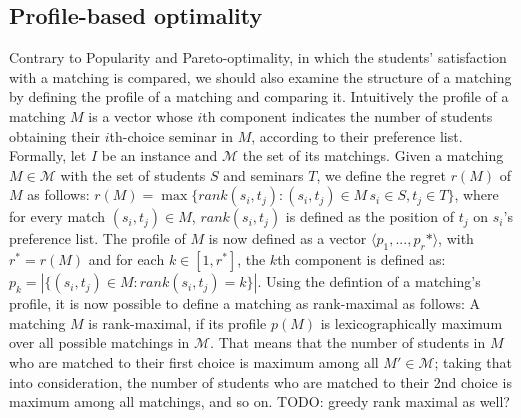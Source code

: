 \subsection{Profile-based optimality}
Contrary to Popularity and Pareto-optimality, in which the students' satisfaction with a matching is compared, we should also examine the structure of a matching by defining the profile of a matching and comparing it. Intuitively the profile of a matching $M$ is a vector whose $i$th component indicates the number of students obtaining their $i$th-choice seminar in $M$, according to their preference list. 
\newline
Formally, let $I$ be an instance and $\mathcal{M}$ the set of its matchings. Given a matching $M \in \mathcal{M}$ with the set of students $S$ and seminars $T$, we define the regret $r(M)$ of $M$ as follows:
$r(M) = \max \{rank(s_i, t_j): (s_i, t_j)\in M\, s_i \in S, t_j \in T\}$, where for every match $(s_i, t_j) \in M$, $rank(s_i, t_j)$ is defined as the position of $t_j$ on $s_i$'s preference list. The profile of $M$ is now defined as a vector $\langle p_1,..., p_r* \rangle$, with $r^* = r(M)$ and for each $k \in [1,r^*]$, the $k$th component is defined as: $p_k=|\{(s_i, t_j) \in M: rank(s_i, t_j) = k\}|$.\cite{algorithmics}
\newline
Using the defintion of a matching's profile, it is now possible to define a matching as rank-maximal as follows: A matching $M$ is rank-maximal, if its profile $p(M)$ is lexicographically maximum over all possible matchings in $\mathcal{M}$. That means that the number of students in $M$ who are matched to their first choice is maximum among all $M' \in \mathcal{M}$; taking that into consideration, the number of students who are matched to their 2nd choice is maximum among all matchings, and so on.
TODO: greedy rank maximal as well? 


